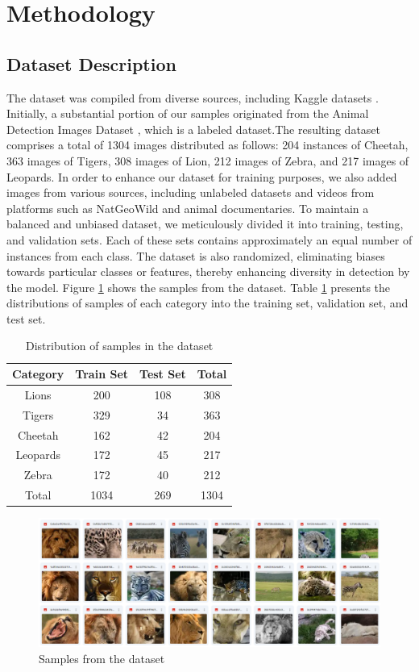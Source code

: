 \documentclass[conference]{IEEEtran}
\begin{document}
\section{Methodology}
\subsection{Dataset Description}
The dataset was compiled from diverse sources, including Kaggle datasets \cite{dave2023wild}. Initially, a substantial portion of our samples originated from the Animal Detection Images Dataset \cite{dave2023wild}, which is a labeled dataset.The resulting dataset comprises a total of 1304 images distributed as follows: 204 instances of Cheetah, 363 images of Tigers, 308 images of Lion, 212 images of Zebra, and 217 images of Leopards. In order to enhance our dataset for training purposes, we also added images from various sources, including unlabeled datasets and videos from platforms such as NatGeoWild and animal documentaries. To maintain a balanced and unbiased dataset, we meticulously divided it into training, testing, and validation sets. Each of these sets contains approximately an equal number of instances from each class. The dataset is also randomized, eliminating biases towards particular classes or features, thereby enhancing diversity in detection by the model. Figure \ref{fig:dataset_samples} shows the samples from the dataset. Table \ref{tab:distribution_samples} presents the distributions of samples of each category into the training set, validation set, and test set.

\begin{table}[htbp]
    \centering
    \caption{Distribution of samples in the dataset}
    \label{tab:distribution_samples}
    \begin{tabular}{cccc}
    \hline
    Category & Train Set & Test Set & Total\\
    \hline
    Lions & 200 & 108 & 308 \\
    Tigers & 329 & 34 & 363 \\
    Cheetah & 162 & 42 & 204 \\
    Leopards & 172 & 45 & 217 \\
    Zebra & 172 & 40 & 212 \\
    \hline
    Total & 1034 & 269 & 1304\\
    \hline
    \end{tabular}
\end{table}

\begin{figure}[htbp]
    \centering
    \includegraphics[width=3.4 in]{Dataset_pic.png}
    \caption{Samples from the dataset}
    \label{fig:dataset_samples}
\end{figure}
\end{document}
